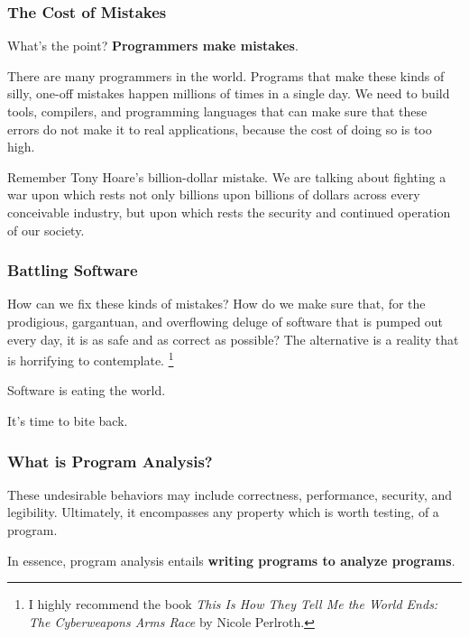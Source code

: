 \documentclass[aspectratio=169, handout]{beamer}
\begin{document}
\begin{frame}[fragile]
  \frametitle{The Cost of Mistakes}

  What's the point? \textbf{Programmers make mistakes}.

  \pause
  \vspace{\fill}

  There are many programmers in the world. Programs that make these
  kinds of silly, one-off mistakes happen millions of times in a single
  day. We need to build tools, compilers, and programming languages that
  can make sure that these errors do not make it to real applications,
  because the cost of doing so is too high.

  \pause
  \vspace{\fill}

  Remember Tony Hoare's billion-dollar mistake. We are talking about
  fighting a war upon which rests not only billions upon billions of
  dollars across every conceivable industry, but upon which rests the
  security and continued operation of our society.
\end{frame}

\begin{frame}[fragile]
  \frametitle{Battling Software}

  How can we fix these kinds of mistakes? How do we make sure that,
  for the prodigious, gargantuan, and overflowing deluge of software
  that is pumped out every day, it is as safe and as correct as possible?
  The alternative is a reality that is horrifying to contemplate.
  \footnote{I highly recommend the book \textit{This Is How They Tell Me
  the World Ends: The Cyberweapons Arms Race} by Nicole Perlroth.}

  \pause
  \vspace{\fill}

  Software is eating the world.

  \pause
  \vspace{\fill}

  It's time to bite back.
\end{frame}


\begin{frame}[fragile]
  \frametitle{What is Program Analysis?}


  \pause
  \vspace{\fill}

  These undesirable behaviors may include correctness, performance,
  security, and legibility. Ultimately, it encompasses any property
  which is worth testing, of a program.

  \pause
  \vspace{\fill}

  In essence, program analysis entails \textbf{writing programs to
  analyze programs}.
\end{frame}
\end{document}

